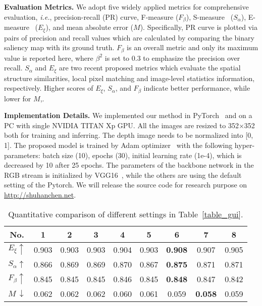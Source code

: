 \documentclass[runningheads]{llncs}
\begin{document}
\textbf{Evaluation Metrics.}
We adopt five widely applied metrics for comprehensive evaluation, \textit{i.e.}, precision-recall (PR) curve, F-measure ($F_{\beta}$), S-measure~\cite{fan2017structure} ($S_{\alpha}$), E-measure~\cite{fan2018enhanced} ($E_{\xi}$), and mean absolute error ($M$). Specifically, PR curve is plotted via pairs of precision and recall values which are calculated by comparing the binary saliency map with its ground truth. $F_{\beta}$ is an overall metric and only its maximum value is reported here, where $\beta^{2}$ is set to 0.3 to emphasize the precision over recall. $S_{\alpha}$ and $E_{\xi}$ are two recent proposed metrics which evaluate the spatial structure similarities, local pixel matching and image-level statistics information, respectively. Higher scores of $E_{\xi}$, $S_{\alpha}$, and $F_{\beta}$ indicate better performance, while lower for $M$,.

\textbf{Implementation Details.}
We implemented our method in PyTorch~\cite{paszke2019pytorch} and on a PC with single NVIDIA TITAN Xp GPU. All the images are resized to 352$\times$352 both for training and inferring. The depth image needs to be normalized into [0, 1]. The proposed model is trained by Adam optimizer~\cite{kingma2015adam} with the following hyper-parameters: batch size (10), epochs (30), initial learning rate (1e-4), which is decreased by 10 after 25 epochs. The parameters of the backbone network in the RGB stream is initialized by VGG16~\cite{simonyan2015very}, while the others are using the default setting of the Pytorch. We will release the source code for research purpose on \url{http://shuhanchen.net}.

\setlength{\tabcolsep}{6pt}
\begin{table}[]
\begin{center}
\caption{Quantitative comparison of different settings in Table~\ref{table_gui}.}
\label{table_gs}
\begin{tabular}{ccccccccc}
\hline
\hline
No.  & 1   & 2   & 3   & 4   & 5   & 6   & 7 & 8  \\ \hline
$E_{\xi}\uparrow$ & 0.903 & 0.903 & 0.903 & 0.904 & 0.903 & \textbf{0.908} & 0.907 & 0.905 \\
$S_{\alpha}\uparrow$ & 0.866 & 0.869 & 0.869 & 0.870 & 0.867 & \textbf{0.875} & 0.871 & 0.871 \\
$F_{\beta}\uparrow$ & 0.845 & 0.845 & 0.845 & 0.846 & 0.845 & \textbf{0.848} & 0.847 & 0.842 \\
$M\,\downarrow$ & 0.062 & 0.062 & 0.062 & 0.060 & 0.061 & 0.059 & \textbf{0.058} & 0.059 \\ \hline
\hline
\end{tabular}
\end{center}
\end{table}
\setlength{\tabcolsep}{1.6pt}
\end{document}
